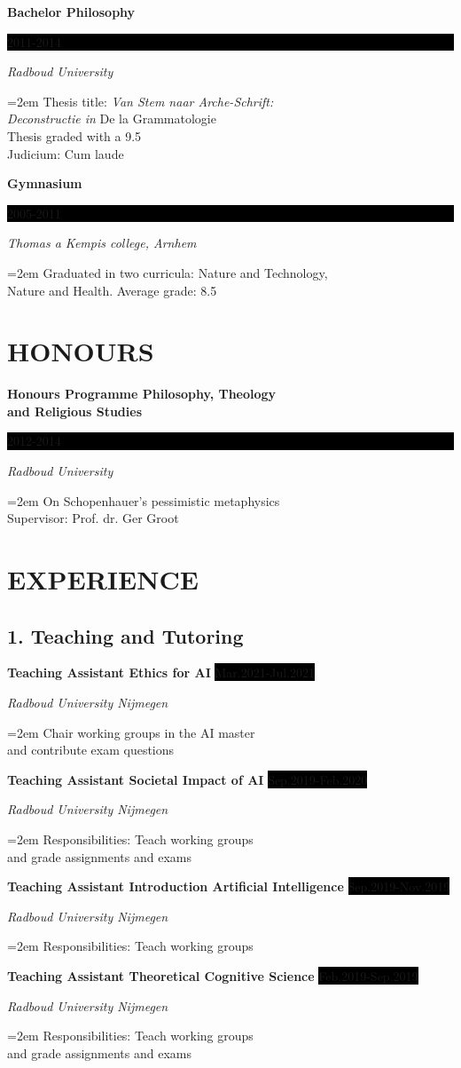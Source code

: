 \documentclass{article}
\newcommand{\sepspace}{\vspace*{1em}}		%
\newcommand{\NewPart}[1]{\section*{\uppercase{#1}}}
\newcommand{\EducationEntry}[4]{
		\noindent \textbf{#1} \hfill      %
		\colorbox{Black}{%
			\parbox{6em}{%
			\hfill\color{White}#2}} \par  %
		\noindent \textit{#3} \par        %
		\noindent\hangindent=2em\hangafter=0 \small #4 %
		\normalsize \par}
\newcommand{\WorkEntry}[4]{				  %
		\noindent \textbf{#1} \hfill      %
		\colorbox{Black}{\color{White}#2} \par  %
		\noindent \textit{#3} \par              %
		\noindent\hangindent=2em\hangafter=0 \small #4 %
		\normalsize \par}
\begin{document}
\sepspace

\EducationEntry{Bachelor Philosophy}{2011-2014}{Radboud University}{Thesis title: \textit{Van Stem naar Arche-Schrift:\\ Deconstructie in} De la Grammatologie\\
Thesis graded with a 9.5\\
Judicium: Cum laude }

\sepspace

\EducationEntry{Gymnasium}{2005-2011}{Thomas a Kempis college, Arnhem}{Graduated in two curricula: Nature and Technology,\\ Nature and Health. Average grade: 8.5
}

\NewPart{Honours}{}

\EducationEntry{Honours Programme Philosophy, Theology\\ and Religious Studies}{2012-2014}{Radboud University}{On Schopenhauer's pessimistic metaphysics\\ Supervisor: Prof. dr. Ger Groot
}

\sepspace

\NewPart{EXPERIENCE}{}

\subsection*{1. Teaching and Tutoring}

\WorkEntry{Teaching Assistant Ethics for AI}{Mar.2021-Jul.2021}{Radboud University Nijmegen}{Chair working groups in the AI master\\ and contribute exam questions}
\sepspace

\WorkEntry{Teaching Assistant Societal Impact of AI}{Sep.2019-Feb.2020}{Radboud University Nijmegen}{Responsibilities: Teach working groups\\ and grade assignments and exams }
\sepspace

\WorkEntry{Teaching Assistant Introduction Artificial Intelligence}{Sep.2019-Nov.2019}{Radboud University Nijmegen}{Responsibilities: Teach working groups }
\sepspace

\WorkEntry{Teaching Assistant Theoretical Cognitive Science}{Feb.2019-Sep.2019}{Radboud University Nijmegen}{Responsibilities: Teach working groups\\ and grade assignments and exams }
\sepspace
\end{document}
